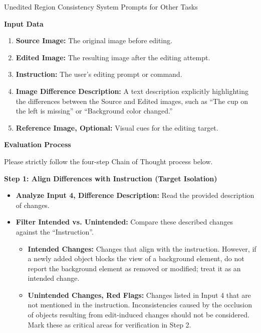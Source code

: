 \documentclass{llmxive}
\begin{document}
\begin{promptbox}[label={System Prompts: URC_Other_Tasks}]{Unedited Region Consistency System Prompts for Other Tasks}
\medskip

\textbf{Input Data}

\begin{enumerate}[label=\arabic*., leftmargin=2.2em, labelsep=0.5em, itemsep=2pt]
    \item \textbf{Source Image:} The original image before editing.
    
    \item \textbf{Edited Image:} The resulting image after the editing attempt.
    
    \item \textbf{Instruction:} The user's editing prompt or command.
    
    \item \textbf{Image Difference Description:} A text description explicitly highlighting the differences between the Source and Edited images, such as ``The cup on the left is missing'' or ``Background color changed.''
    
    \item \textbf{Reference Image, Optional:} Visual cues for the editing target.
\end{enumerate}

\medskip

\textbf{Evaluation Process}

Please strictly follow the four-step Chain of Thought process below.

\medskip

\textbf{Step 1: Align Differences with Instruction (Target Isolation)}

\begin{itemize}[leftmargin=2.2em, labelsep=0.5em, itemsep=2pt]
    \item \textbf{Analyze Input 4, Difference Description:} Read the provided description of changes.
    
    \item \textbf{Filter Intended vs. Unintended:} Compare these described changes against the ``Instruction''.
    
    \begin{itemize}[leftmargin=2.2em, labelsep=0.5em, itemsep=2pt]
        \item \textbf{Intended Changes:} Changes that align with the instruction. However, if a newly added object blocks the view of a background element, do not report the background element as removed or modified; treat it as an intended change.
        
        \item \textbf{Unintended Changes, Red Flags:} Changes listed in Input 4 that are not mentioned in the instruction. Inconsistencies caused by the occlusion of objects resulting from edit-induced changes should not be considered. Mark these as critical areas for verification in Step 2.
    \end{itemize}
    

\end{itemize}
\end{promptbox}
\end{document}
